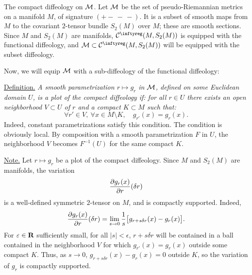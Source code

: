 \begin{Article}{The compact diffeology on $\mathcal{M}$.}{}
  Let $\mathcal{M}$ be the set of pseudo-Rie\-man\-nian metrics on a manifold $M$,
  of signature $(+ -\, -\, -)$.
  It is a subset of smooth maps from $M$ to the covariant $2$-tensor bundle $S_2(M)$ over $M$;
  these are smooth sections.
  Since $M$ and $S_2(M)$ are manifolds,
  $\Cinfty(M,S_2(M))$ is equipped with the functional diffeology,
  and $\cM \subset \Cinfty(M,S_2(M))$ will be equipped with the subset diffeology.
  
  Now, we will equip $\mathcal{M}$ with a sub-diffeology of the functional diffeology:
  
  \uline{Definition.} {\itshape A smooth parametrization $r \mapsto g_r$ in $\mathcal{M}$,
  defined on some Euclidean domain $U$,
  is a plot of the \emph{compact diffeology} if:
  for all $r \in U$ there exists an open neighborhood $V \subset U$ of $r$ and a compact $K \subset M$ such that:
  $$
    \forall r' \in V,\ \forall x \in M \setminus K,\quad g_{r'}(x) = g_{r}(x).
  $$}
  Indeed,
  constant parametrizations satisfy this condition.
  The condition is obviously local.
  By composition with a smooth parametrization $F$ in $U$,
  the neighborhood $V$ becomes $F^{-1}(U)$ for the same compact $K$.
  
  \uline{Note.} Let $r \mapsto g_r$ be a plot of the compact diffeology.
  Since $M$ and $S_2(M)$ are manifolds,
  the variation
  $$
    {\partial g_r(x) \over \partial r}(\delta r)
  $$
  is a well-defined symmetric $2$-tensor on $M$,
  and is compactly supported.
  Indeed,
  $$
    {\partial g_r(x) \over \partial r}(\delta r) = \lim_{s \to 0} {1 \over s} \big[g_{r + s \delta r}(x) - g_r(x)\big].
  $$
  For $\varepsilon \in \mathbf{R}$ sufficiently small,
  for all $|s| < \epsilon$,
  $r + s \delta r$ will be contained in a ball contained in the neighborhood $V$ for which $g_{r'}(x) = g_r(x)$ outside some compact $K$.
  Thus,
  as $s \to 0$,
  $g_{r + s \delta r}(x) - g_r(x) = 0$ outside $K$,
  so the variation of $g_r$ is compactly supported.
\end{Article}

